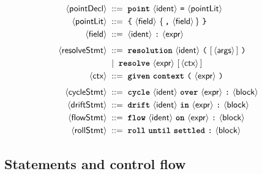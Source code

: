 \documentclass[11pt,a4paper]{article}
\theoremstyle{plain}
\theoremstyle{definition}
\theoremstyle{remark}
\newcommand{\nt}[1]{\ensuremath{\langle\textsf{#1}\rangle}}  %
\newcommand{\tm}[1]{\textbf{\texttt{#1}}}                 %
\newcommand{\opt}[1]{\ensuremath{[\,#1\,]}}               %
\newcommand{\rep}[1]{\ensuremath{\{\,#1\,\}}}             %
\newcommand{\bnfeq}{\;::=\;}
\newcommand{\bnfor}{\;\mid\;}
\begin{document}
\begin{align*}
\nt{pointDecl} &\bnfeq \tm{point}\ \nt{ident}\ \texttt{=}\ \nt{pointLit}\\
\nt{pointLit}  &\bnfeq \texttt{\{}\ \nt{field}\
                       \rep{\texttt{,}\ \nt{field}}\ \texttt{\}}\\
\nt{field}     &\bnfeq \nt{ident}\ \texttt{:}\ \nt{expr}\\[4pt]
\nt{resolveStmt}&\bnfeq \tm{resolution}\ \nt{ident}\
                       \texttt{(}\ \opt{\nt{args}}\ \texttt{)}\\
               &\bnfor \tm{resolve}\ \nt{expr}\ \opt{\nt{ctx}}\\
\nt{ctx}       &\bnfeq \tm{given}\ \tm{context}\ \texttt{(}\ \nt{expr}\
                       \texttt{)}\\[4pt]
\nt{cycleStmt} &\bnfeq \tm{cycle}\ \nt{ident}\ \tm{over}\ \nt{expr}\
                       \texttt{:}\ \nt{block}\\
\nt{driftStmt} &\bnfeq \tm{drift}\ \nt{ident}\ \tm{in}\ \nt{expr}\
                       \texttt{:}\ \nt{block}\\
\nt{flowStmt}  &\bnfeq \tm{flow}\ \nt{ident}\ \tm{on}\ \nt{expr}\
                       \texttt{:}\ \nt{block}\\
\nt{rollStmt}  &\bnfeq \tm{roll}\ \tm{until}\ \tm{settled}\ \texttt{:}\
                       \nt{block}
\end{align*}

\subsection{Statements and control flow}
\end{document}
